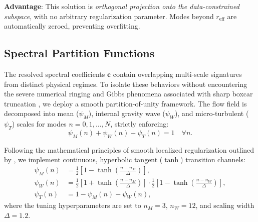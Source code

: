 \documentclass[11pt,a4paper]{article}
\begin{document}
\textbf{Advantage}: This solution is \emph{orthogonal projection onto the data-constrained subspace}, with no arbitrary regularization parameter. Modes beyond $r_{\mathrm{eff}}$ are automatically zeroed, preventing overfitting.

\subsection{Spectral Partition Functions}
\label{sec:methods:partition}

The resolved spectral coefficients $\mathbf{c}$ contain overlapping multi-scale signatures from distinct physical regimes. To isolate these behaviors without encountering the severe numerical ringing and Gibbs phenomena associated with sharp boxcar truncation \citep{Trefethen2000, Boyd2001}, we deploy a smooth partition-of-unity framework. The flow field is decomposed into mean ($\psi_M$), internal gravity wave ($\psi_W$), and micro-turbulent ($\psi_T$) scales for modes $n = 0, 1, \ldots, N$, strictly enforcing:
\begin{equation}
    \psi_M(n) + \psi_W(n) + \psi_T(n) = 1 \quad \forall n.
\end{equation}

Following the mathematical principles of smooth localized regularization outlined by \citet{Fornberg1996}, we implement continuous, hyperbolic tangent ($\tanh$) transition channels:
\begin{align}
    \psi_M(n) &= \frac{1}{2}\left[1 - \tanh\left(\frac{n - n_M}{\Delta}\right)\right], \label{eq:psi_m} \\
    \psi_W(n) &= \frac{1}{2}\left[1 + \tanh\left(\frac{n - n_M}{\Delta}\right)\right] \cdot \frac{1}{2}\left[1 - \tanh\left(\frac{n - n_W}{\Delta}\right)\right], \label{eq:psi_w} \\
    \psi_T(n) &= 1 - \psi_M(n) - \psi_W(n), \label{eq:psi_t}
\end{align}
where the tuning hyperparameters are set to $n_M = 3$, $n_W = 12$, and scaling width $\Delta = 1.2$.
\end{document}
